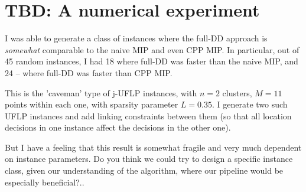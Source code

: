 \documentclass[11pt]{article}
\begin{document}
\section{TBD: A numerical experiment}
\label{sec:org8aafe77}
I was able to generate a class of instances where the full-DD
approach is \emph{somewhat} comparable to the naive MIP and even CPP MIP. In particular,
out of 45 random instances, I had 18 where full-DD was faster than the naive MIP,
and 24 -- where full-DD was faster than CPP MIP.

This is the 'caveman' type of j-UFLP instances, with \(n=2\) clusters, \(M=11\)
points within each one, with sparsity parameter \(L=0.35\). I generate two such
UFLP instances and add linking constraints between them (so that all location
decisions in one instance affect the decisions in the other one).

But I have a feeling that this result is somewhat fragile and very much
dependent on instance parameters. Do you think we could try to design a specific
instance class, given our understanding of the algorithm, where our pipeline
would be especially beneficial?..

\printbibliography
\end{document}
